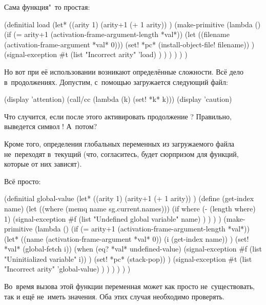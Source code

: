 
Сама функция"~то простая:

\begin{code:lisp}
(definitial load
  (let* ((arity 1)
         (arity+1 (+ 1 arity)) )
    (make-primitive
     (lambda ()
       (if (= arity+1 (activation-frame-argument-length *val*))
           (let ((filename (activation-frame-argument *val* 0)))
             (set! *pc* (install-object-file! filename)) )
           (signal-exception
            #t (list "Incorrect arity" 'load) ) ) ) ) ) )
\end{code:lisp}

\noindent
Но вот при её использовании возникают определённые сложности. Всё дело
в~продолжениях. Допустим, с~помощью  загружается следующий файл:

\begin{code:lisp}
(display 'attention)
(call/cc (lambda (k) (set! *k* k)))
(display 'caution)
\end{code:lisp}

\noindent
Что случится, если после этого активировать продолжение ? Правильно,
выведется символ ! А~потом?

Кроме того, определения глобальных переменных из загружаемого файла не~переходят
в~текущий (что, согласитесь, будет сюрпризом для функций, которые от них
зависят).



Всё просто:

\begin{code:lisp}
(definitial global-value
  (let* ((arity 1)
         (arity+1 (+ 1 arity)) )
    (define (get-index name)
      (let ((where (memq name sg.current.names)))
        (if where
            (- (length where) 1)
            (signal-exception
             #f (list "Undefined global variable" name) ) ) ) )
    (make-primitive
     (lambda ()
       (if (= arity+1 (activation-frame-argument-length *val*))
           (let* ((name (activation-frame-argument *val* 0))
                  (i (get-index name)) )
             (set! *val* (global-fetch i))
             (when (eq? *val* undefined-value)
               (signal-exception #f (list "Uninitialized variable" i)) )
             (set! *pc* (stack-pop)) )
           (signal-exception
            #t (list "Incorrect arity" 'global-value) ) ) ) ) ) )
\end{code:lisp}

Во~время вызова этой функции переменная может как просто не~существовать, так и
ещё не~иметь значения. Оба этих случая необходимо проверять.


